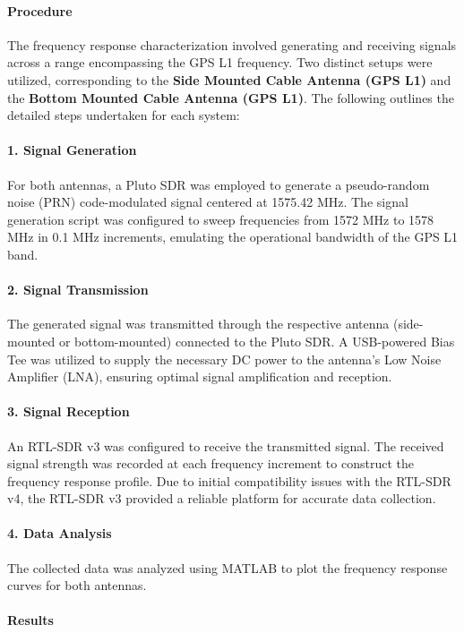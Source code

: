\documentclass[12pt,letter]{article}
\begin{document}
\paragraph{Procedure}
The frequency response characterization involved generating and receiving signals across a range encompassing the GPS L1 frequency. Two distinct setups were utilized, corresponding to the \textbf{Side Mounted Cable Antenna (GPS L1)} and the \textbf{Bottom Mounted Cable Antenna (GPS L1)}. The following outlines the detailed steps undertaken for each system:

\paragraph{1. Signal Generation}
For both antennas, a Pluto SDR was employed to generate a pseudo-random noise (PRN) code-modulated signal centered at 1575.42 MHz. The signal generation script was configured to sweep frequencies from 1572 MHz to 1578 MHz in 0.1 MHz increments, emulating the operational bandwidth of the GPS L1 band.

\paragraph{2. Signal Transmission}
The generated signal was transmitted through the respective antenna (side-mounted or bottom-mounted) connected to the Pluto SDR. A USB-powered Bias Tee was utilized to supply the necessary DC power to the antenna's Low Noise Amplifier (LNA), ensuring optimal signal amplification and reception.

\paragraph{3. Signal Reception}
An RTL-SDR v3 was configured to receive the transmitted signal. The received signal strength was recorded at each frequency increment to construct the frequency response profile. Due to initial compatibility issues with the RTL-SDR v4, the RTL-SDR v3 provided a reliable platform for accurate data collection.

\paragraph{4. Data Analysis}
The collected data was analyzed using MATLAB to plot the frequency response curves for both antennas. 

\paragraph{Results}
\end{document}
